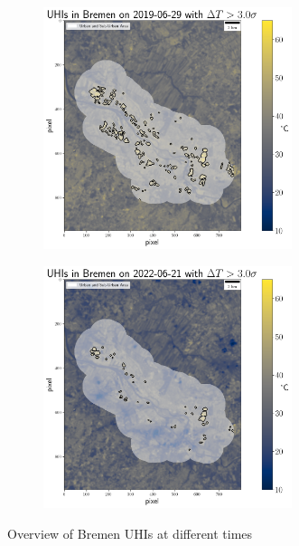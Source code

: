 \documentclass[12pt,a4paper, english,twoside]{scrartcl}
\begin{document}
   \begin{figure}[!p]
       \begin{subfigure}{\textwidth}
          \centering
          \includegraphics[width=0.8\textwidth]{img/UHIs_Bremen_2019-06-29_s:3}
         \label{fig:uhis2019}
       \end{subfigure}

       \begin{subfigure}{\textwidth}
          \centering
          \includegraphics[width=0.8\textwidth]{img/UHIs_Bremen_2022-06-21_s:3}
         \label{fig:uhis2022}
       \end{subfigure}
         \caption{Overview of Bremen \glspl{UHI} at different times}\label{fig:AnalysisBre}
   \end{figure}
\end{document}
